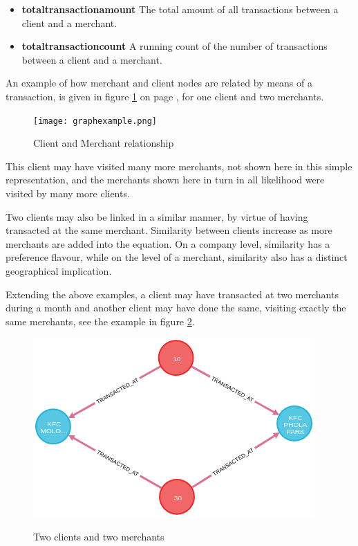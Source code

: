\begin{itemize}
  \item \textbf{totaltransactionamount} The total amount of all transactions between a client and a merchant.
  \item \textbf{totaltransactioncount} A running count of the number of transactions between a client and a merchant.  
\end{itemize}

An example of how merchant and client nodes are related by means of a transaction, is given in figure \ref{fig:graphexample} on page , for one client and two merchants. 

\begin{figure}[htb]
\caption{Client and Merchant relationship}
\centering
\texttt{[image: graphexample.png]}
\label{fig:graphexample}
\end{figure}

This client may have visited many more merchants, not shown here in this simple representation, and the merchants shown here in turn in all likelihood were visited by many more clients.

Two clients may also be linked in  a similar manner, by virtue of having transacted at the same merchant. Similarity between clients increase as more merchants are added into the equation.  On a company level, similarity has a preference flavour, while on the level of a merchant, similarity also has a distinct geographical implication.

Extending the above examples, a client may have transacted at two merchants during a month and another client may have done the same, visiting exactly the same merchants, see the example in figure \ref{fig:two clients_two merchants}.

\begin{figure}[htb!]
\caption{Two clients and two merchants}
\centering
\includegraphics[width=\textwidth]{png/client_merchant_graph.png}
\label{fig:two clients_two merchants}
\end{figure}

